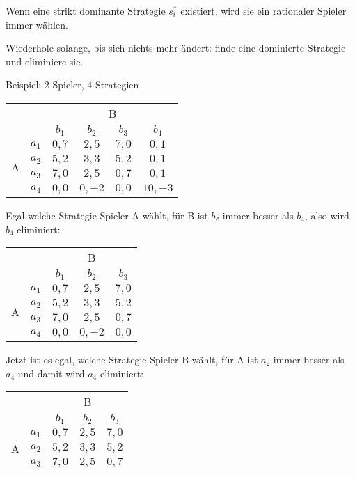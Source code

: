 Wenn eine strikt dominante Strategie $s^*_i$ existiert, wird sie ein rationaler Spieler
immer wählen.

\begin{definition}
  Wiederhole solange, bis sich nichts mehr ändert:
  finde eine dominierte Strategie und eliminiere sie.
\end{definition}

Beispiel: 2 Spieler, 4 Strategien

\begin{center}
  \begin{tabular}{cccccc}
    & & \multicolumn{4}{c}{B}\\
    & & $b_1$ & $b_2$ & $b_3$ & $b_4$\\
    \cmidrule{3-6}
    \multirow{4}{*}{A} & $a_1$ & $0,7$ & $2,5$ & $7,0$ & $0,1$\\
    \cmidrule{3-6}
    & $a_2$ & $5,2$ & $3,3$ & $5,2$ & $0,1$\\
    \cmidrule{3-6}
    & $a_3$ & $7,0$ & $2,5$ & $0,7$ & $0,1$\\
    \cmidrule{3-6}
    & $a_4$ & $0,0$ & $0,-2$ & $0,0$ & $10,-3$\\
    \cmidrule{3-6}
  \end{tabular}
\end{center}

Egal welche Strategie Spieler A wählt, für B ist $b_2$ immer besser als $b_4$, also wird
$b_4$ eliminiert:

\begin{center}
  \begin{tabular}{ccccc}
    & & \multicolumn{3}{c}{B}\\
    & & $b_1$ & $b_2$ & $b_3$\\
    \cmidrule{3-5}
    \multirow{4}{*}{A} & $a_1$ & $0,7$ & $2,5$ & $7,0$\\
    \cmidrule{3-5}
    & $a_2$ & $5,2$ & $3,3$ & $5,2$\\
    \cmidrule{3-5}
    & $a_3$ & $7,0$ & $2,5$ & $0,7$\\
    \cmidrule{3-5}
    & $a_4$ & $0,0$ & $0,-2$ & $0,0$\\
    \cmidrule{3-5}
  \end{tabular}
\end{center}

Jetzt ist es egal, welche Strategie Spieler B wählt, für A ist $a_2$ immer besser als
$a_4$ und damit wird $a_4$ eliminiert:

\begin{center}
  \begin{tabular}{ccccc}
    & & \multicolumn{3}{c}{B}\\
    & & $b_1$ & $b_2$ & $b_3$\\
    \cmidrule{3-5}
    \multirow{4}{*}{A} & $a_1$ & $0,7$ & $2,5$ & $7,0$\\
    \cmidrule{3-5}
    & $a_2$ & $5,2$ & $3,3$ & $5,2$\\
    \cmidrule{3-5}
    & $a_3$ & $7,0$ & $2,5$ & $0,7$\\
    \cmidrule{3-5}
  \end{tabular}
\end{center}

